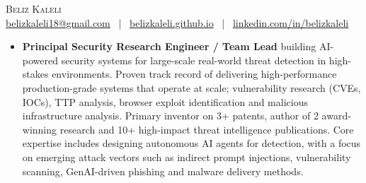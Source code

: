 \documentclass[letterpaper,11pt]{article}
\begin{document}

\begin{center}
    {\Huge \scshape Beliz Kaleli} \\ \vspace{2pt}
    \small
    \href{mailto:belizkaleli18@gmail.com}{belizkaleli18@gmail.com} ~|~
    \href{https://belizkaleli.github.io}{belizkaleli.github.io} ~|~
    \href{https://linkedin.com/in/belizkaleli}{linkedin.com/in/belizkaleli}
    \vspace{-14pt}
\end{center}

\vspace{2pt}
\begin{itemize}[leftmargin=0.0in, label={}]
  \item \small \textbf{Principal Security Research Engineer / Team Lead} building AI-powered security systems for large-scale real-world threat detection in high-stakes environments. Proven track record of delivering high-performance production-grade systems that operate at scale; vulnerability research (CVEs, IOCs), TTP analysis, browser exploit identification and malicious infrastructure analysis. Primary inventor on 3+ patents, author of 2 award-winning research and 10+ high-impact threat intelligence publications. Core expertise includes designing autonomous AI agents for detection, with a focus on emerging attack vectors such as indirect prompt injections, vulnerability scanning, GenAI-driven phishing and malware delivery methods.

\end{itemize}
\vspace{-16pt}
\end{document}
